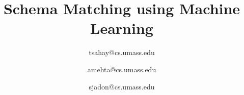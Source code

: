 \documentclass[conference]{IEEEtran}
\begin{document}
%
\title{Schema Matching using Machine Learning}


\author{
tsahay@cs.umass.edu
\and
{}
amehta@cs.umass.edu
\and
{}
sjadon@cs.umass.edu}


% 








\maketitle
\end{document}

